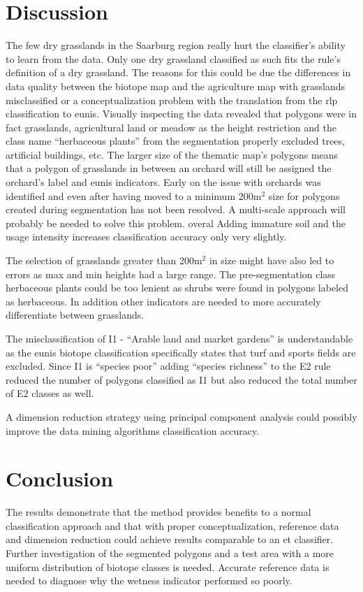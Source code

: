 \documentclass[authoryear,preprint,12pt,number]{elsarticle}
\begin{document}
\section{Discussion}
The few dry grasslands in the Saarburg region really hurt the classifier's 
ability to learn from the data. Only one dry grassland classified as such fits 
the rule's definition of a dry grassland. The reasons for this could be due the 
differences in data quality between the biotope map and the agriculture map 
with grasslands misclassified or a conceptualization problem with the 
translation from the \gls{rlp} classification to \gls{eunis}. Visually 
inspecting the data revealed that polygons were in fact grasslands, agricultural 
land or meadow as the height restriction and the class name ``herbaceous 
plants'' from the segmentation properly excluded trees, artificial buildings, 
etc. The larger size of the thematic map's polygons means that a polygon of 
grasslands in between an orchard will still be assigned the orchard's label and 
\gls{eunis} indicators. Early on the issue with orchards was identified and even 
after having moved to a minimum 200m$^{2}$ size for polygons created during 
segmentation has not been resolved. A multi-scale approach will probably be 
needed to solve this problem. overal Adding immature soil and the usage 
intensity increases classification accuracy only very slightly.

The selection of grasslands greater than 200m$^{2}$ in size might have also led
to errors as max and min heights had a large range. The pre-segmentation class
herbaceous plants could be too lenient as shrubs were found in polygons labeled
as herbaceous. In addition other indicators are needed to more accurately
differentiate between grasslands.

The misclassification of I1 - ``Arable land and market gardens'' is 
understandable as the \gls{eunis} biotope classification specifically states 
that 
turf and sports fields are excluded. Since I1 is ``species poor'' adding 
``species richness'' to the E2 rule reduced the number of polygons classified 
as I1 but also reduced the total number of E2 classes as well.

A dimension reduction strategy using principal component analysis could possibly
improve the data mining algorithms classification accuracy.
\section{Conclusion}
The results demonstrate that the method provides benefits to a normal
classification approach and that with proper conceptualization, reference data
and dimension reduction could achieve results comparable to an \gls{et} 
classifier.
Further investigation of the segmented polygons and a test area with a more
uniform distribution of biotope classes is needed. Accurate reference data is
needed to diagnose why the wetness indicator performed so poorly.
\end{document}
